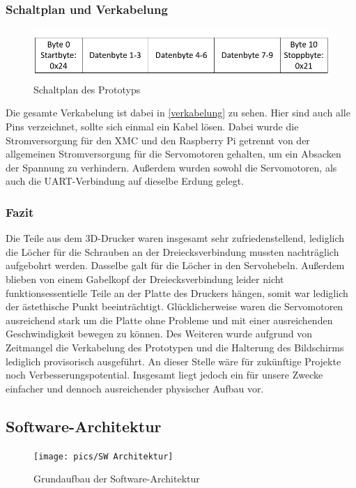 \documentclass[12pt,a4paper,bibliography=totoc,listof=totoc]{scrartcl}
\begin{document}
\subsubsection{Schaltplan und Verkabelung}

\begin{figure}[htbp]
	\centering
	\includegraphics[scale = 0.5]{pics/Schaltplan}
	\caption{Schaltplan des Prototyps}
	\label{fig:verkabelung}
\end{figure}
Die gesamte Verkabelung ist dabei in \ref{verkabelung} zu sehen. Hier sind auch alle Pins verzeichnet, 
sollte sich einmal ein Kabel lösen. Dabei wurde die Stromversorgung für den XMC und den Raspberry Pi getrennt 
von der allgemeinen Stromversorgung für die Servomotoren gehalten, um ein Absacken der Spannung zu verhindern.
Außerdem wurden sowohl die Servomotoren, als auch die UART-Verbindung auf dieselbe Erdung gelegt.

\subsubsection{Fazit}
Die Teile aus dem 3D-Drucker waren insgesamt sehr zufriedenstellend, lediglich die Löcher für die Schrauben 
an der Dreiecksverbindung mussten nachträglich aufgebohrt werden. Dasselbe galt für die Löcher in den Servohebeln. 
Außerdem blieben von einem Gabelkopf der Dreiecksverbindung leider nicht funktionsessentielle Teile an der Platte 
des Druckers hängen, somit war lediglich der ästethische Punkt beeinträchtigt. Glücklicherweise waren die 
Servomotoren ausreichend stark um die Platte ohne Probleme und mit einer ausreichenden Geschwindigkeit bewegen zu 
können. Des Weiteren wurde aufgrund von Zeitmangel die Verkabelung des Prototypen und die Halterung des Bildschirms 
lediglich provisorisch ausgeführt. An dieser Stelle wäre für zukünftige Projekte noch Verbesserungspotential. 
Insgesamt liegt jedoch ein für unsere Zwecke einfacher und dennoch ausreichender physischer Aufbau vor.

\subsection{Software-Architektur}
\begin{figure}[htbp]
	\centering
	\texttt{[image: pics/SW Architektur]}
	\caption{Grundaufbau der Software-Architektur}
	\label{fig:SWarchitektur}
\end{figure}
\end{document}
